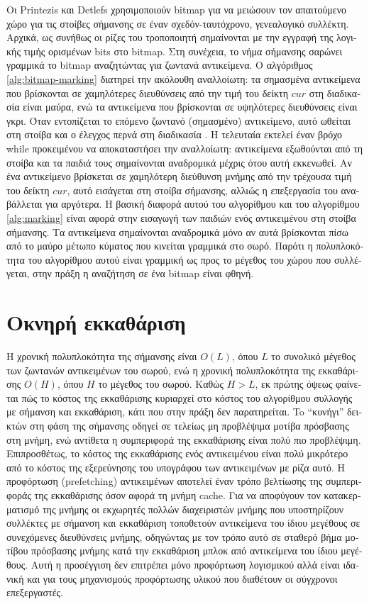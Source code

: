 \begin{greek}
Οι Printezis και Detlefs \cite{DBLP:conf/iwmm/PrintezisD00}
χρησιμοποιούν bitmap για να μειώσουν τον απαιτούμενο χώρο
για τις στοίβες σήμανσης σε έναν σχεδόν-ταυτόχρονο, γενεαλογικό
συλλέκτη. Αρχικά, ως συνήθως οι ρίζες του τροποποιητή σημαίνονται
με την εγγραφή της λογικής τιμής ορισμένων bits στο bitmap.
Στη συνέχεια, το νήμα σήμανσης σαρώνει γραμμικά το bitmap αναζητώντας
για ζωντανά αντικείμενα. Ο αλγόριθμος \ref{alg:bitmap-marking}
διατηρεί την ακόλουθη αναλλοίωτη: τα σημασμένα αντικείμενα
που βρίσκονται σε χαμηλότερες διευθύνσεις από την τιμή του
δείκτη $cur$ στη διαδικασία  είναι μαύρα,
ενώ τα αντικείμενα που βρίσκονται σε υψηλότερες διευθύνσεις
είναι γκρι. Όταν εντοπίζεται το επόμενο ζωντανό (σημασμένο)
αντικείμενο, αυτό ωθείται στη στοίβα και ο έλεγχος περνά
στη διαδικασία . Η τελευταία εκτελεί έναν
βρόχο while προκειμένου να αποκαταστήσει την αναλλοίωτη:
αντικείμενα εξωθούνται από τη στοίβα και τα παιδιά τους
σημαίνονται αναδρομικά μέχρις ότου αυτή εκκενωθεί. Αν ένα
αντικείμενο βρίσκεται σε χαμηλότερη διεύθυνση μνήμης από
την τρέχουσα τιμή του δείκτη $cur$, αυτό εισάγεται στη στοίβα
σήμανσης, αλλιώς η επεξεργασία του αναβάλλεται για αργότερα. 
Η βασική διαφορά αυτού του αλγορίθμου και του αλγορίθμου 
\ref{alg:marking} είναι αφορά στην εισαγωγή των παιδιών ενός 
αντικειμένου στη στοίβα σήμανσης. Τα αντικείμενα σημαίνονται 
αναδρομικά μόνο αν αυτά βρίσκονται πίσω από το μαύρο μέτωπο κύματος 
που κινείται γραμμικά στο σωρό. Παρότι η πολυπλοκότητα του αλγορίθμου 
αυτού είναι γραμμική ως προς το μέγεθος του χώρου που συλλέγεται, 
στην πράξη η αναζήτηση σε ένα bitmap είναι φθηνή.
 
\section{Οκνηρή εκκαθάριση}
Η χρονική πολυπλοκότητα της σήμανσης είναι $O(L)$, όπου $L$ το 
συνολικό μέγεθος των ζωντανών αντικειμένων του σωρού, ενώ η 
χρονική πολυπλοκότητα της εκκαθάρισης $O(H)$, όπου $H$ το μέγεθος 
του σωρού. Καθώς $H>L$, εκ πρώτης όψεως φαίνεται πώς το κόστος 
της εκκαθάρισης κυριαρχεί στο κόστος του αλγορίθμου συλλογής με 
σήμανση και εκκαθάριση, κάτι που στην πράξη δεν παρατηρείται. To 
``κυνήγι'' δεικτών στη φάση της σήμανσης οδηγεί σε τελείως μη 
προβλέψιμα μοτίβα πρόσβασης στη μνήμη, ενώ αντίθετα η συμπεριφορά 
της εκκαθάρισης είναι πολύ πιο προβλέψιμη. Επιπροσθέτως, το 
κόστος της εκκαθάρισης ενός αντικειμένου είναι πολύ μικρότερο από 
το κόστος της εξερεύνησης του υπογράφου των αντικειμένων με ρίζα 
αυτό. Η προφόρτωση (prefetching) αντικειμένων αποτελεί έναν τρόπο 
βελτίωσης της συμπεριφοράς της εκκαθάρισης όσον αφορά τη μνήμη 
cache. Για να αποφύγουν τον κατακερματισμό της μνήμης οι εκχωρητές 
πολλών διαχειριστών μνήμης που υποστηρίζουν συλλέκτες με σήμανση 
και εκκαθάριση τοποθετούν αντικείμενα του ίδιου μεγέθους σε 
συνεχόμενες διευθύνσεις μνήμης, οδηγώντας με τον τρόπο αυτό σε
σταθερό βήμα μοτίβου πρόσβασης μνήμης κατά την εκκαθάριση μπλοκ
από αντικείμενα του ίδιου μεγέθους. Αυτή η προσέγγιση δεν 
επιτρέπει μόνο προφόρτωση λογισμικού αλλά είναι ιδανική και για
τους μηχανισμούς προφόρτωσης υλικού που διαθέτουν οι σύγχρονοι
επεξεργαστές.


\end{greek}
